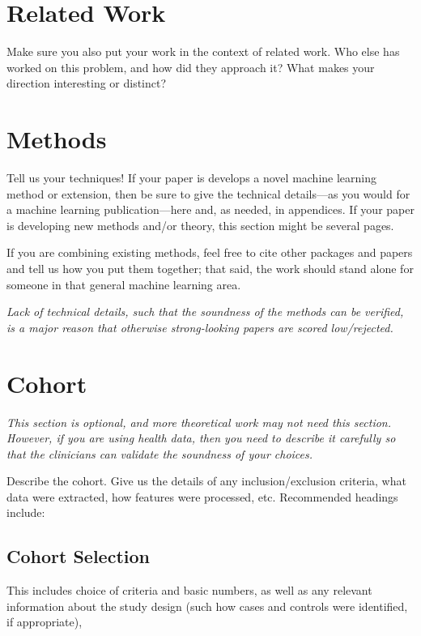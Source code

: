 \documentclass[pmlr]{jmlr}%
\begin{document}
\section{Related Work}

Make sure you also put your work in the context of related
work.  Who else has worked on this problem, and how did they approach
it?  What makes your direction interesting or distinct?

\section{Methods}

Tell us your techniques!  If your paper is develops a novel machine
learning method or extension, then be sure to give the technical
details---as you would for a machine learning publication---here and,
as needed, in appendices.  If your paper is developing new methods
and/or theory, this section might be several pages.

If you are combining existing methods, feel free to cite other
packages and papers and tell us how you put them together; that said,
the work should stand alone for someone in that general machine
learning area.  

\emph{Lack of technical details, such that the soundness of the
  methods can be verified, is a major reason that otherwise
  strong-looking papers are scored low/rejected.}

\section{Cohort}

\emph{This section is optional, and more theoretical work may not need
  this section.  However, if you are using health data, then you need
  to describe it carefully so that the clinicians can validate the
  soundness of your choices.} 

Describe the cohort.  Give us the details of any inclusion/exclusion
criteria, what data were extracted, how features were processed,
etc.  Recommended headings include:

\subsection{Cohort Selection} 
This includes choice of criteria and basic numbers, as well as any relevant
information about the study design (such how cases and controls were
identified, if appropriate), 
\end{document}
